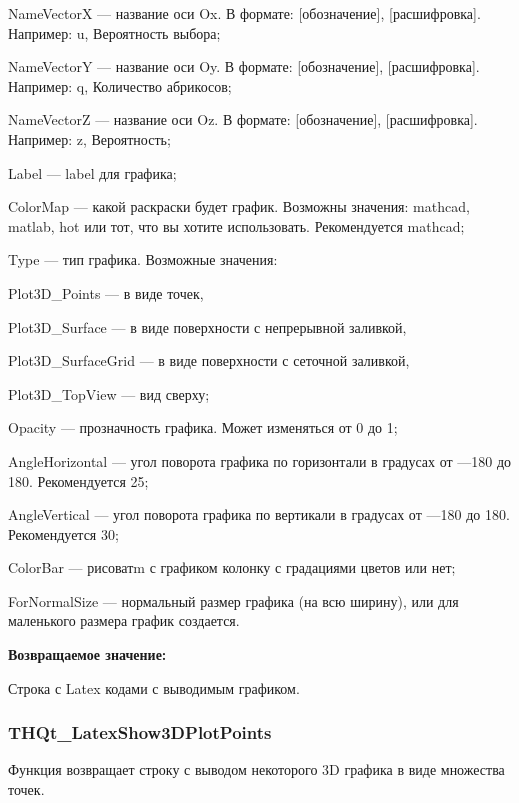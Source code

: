 \documentclass[a4paper,12pt]{article}
\begin{document}
    NameVectorX --- название оси Ox. В формате: [обозначение], [расшифровка]. Например: u, Вероятность выбора;
 
    NameVectorY --- название оси Oy. В формате: [обозначение], [расшифровка]. Например: q, Количество абрикосов;
 
    NameVectorZ --- название оси Oz. В формате: [обозначение], [расшифровка]. Например: z, Вероятность;
 
    Label --- label для графика;
 
    ColorMap --- какой раскраски будет график. Возможны значения: mathcad, matlab, hot или тот, что вы хотите использовать. Рекомендуется mathcad;
 
    Type --- тип графика. Возможные значения:
 
       Plot3D\_Points --- в виде точек,
 
       Plot3D\_Surface --- в виде поверхности с непрерывной заливкой,
 
       Plot3D\_SurfaceGrid --- в виде поверхности с сеточной заливкой,
 
       Plot3D\_TopView --- вид сверху;
 
    Opacity --- прозначность графика. Может изменяться от 0 до 1;
 
    AngleHorizontal --- угол поворота графика по горизонтали в градусах от ---180 до 180. Рекомендуется 25;
 
    AngleVertical --- угол поворота графика по вертикали в градусах от ---180 до 180. Рекомендуется 30;
 
    ColorBar --- рисоватm с графиком колонку с градациями цветов или нет;
 
    ForNormalSize --- нормальный размер графика (на всю ширину), или для маленького размера график создается.
	
\textbf{Возвращаемое значение:}

Строка с Latex кодами с выводимым графиком.


\subsubsection{THQt\_LatexShow3DPlotPoints}\label{THQt_LatexShow3DPlotPoints}

Функция возвращает строку с выводом некоторого 3D графика в виде множества точек.
\end{document}
